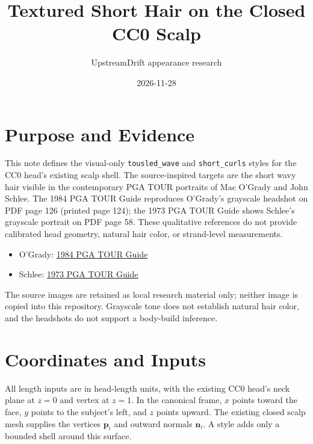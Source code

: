 \documentclass[11pt]{article}
\title{Textured Short Hair on the Closed CC0 Scalp}
\author{UpstreamDrift appearance research}
\date{2026-11-28}
\begin{document}
\maketitle

\section{Purpose and Evidence}
This note defines the visual-only \texttt{tousled\_wave} and
\texttt{short\_curls} styles for the CC0 head's existing scalp shell. The
source-inspired targets are the short wavy hair visible in the contemporary
PGA TOUR portraits of Mac O'Grady and John Schlee. The 1984 PGA TOUR Guide
reproduces O'Grady's grayscale headshot on PDF page 126 (printed page 124);
the 1973 PGA TOUR Guide shows Schlee's grayscale portrait on PDF page 58.
These qualitative references do not provide calibrated head geometry, natural
hair color, or strand-level measurements.

\begin{itemize}
  \item O'Grady: \href{https://pgatourmedia.pgatourhq.com/static-assets/page/header/files/1984_pgatour.pdf}{1984 PGA TOUR Guide}
  \item Schlee: \href{https://pgatourmedia.pgatourhq.com/static-assets/page/header/files/1973_pgatour.pdf}{1973 PGA TOUR Guide}
\end{itemize}
The source images are retained as local research material only; neither image
is copied into this repository. Grayscale tone does not establish natural hair
color, and the headshots do not support a body-build inference.

\section{Coordinates and Inputs}
All length inputs are in head-length units, with the existing CC0 head's neck
plane at $z=0$ and vertex at $z=1$. In the canonical frame, $x$ points toward
the face, $y$ points to the subject's left, and $z$ points upward. The existing
closed scalp mesh supplies the vertices $\mathbf{p}_i$ and outward normals
$\mathbf{n}_i$. A style adds only a bounded shell around this surface.
\end{document}
